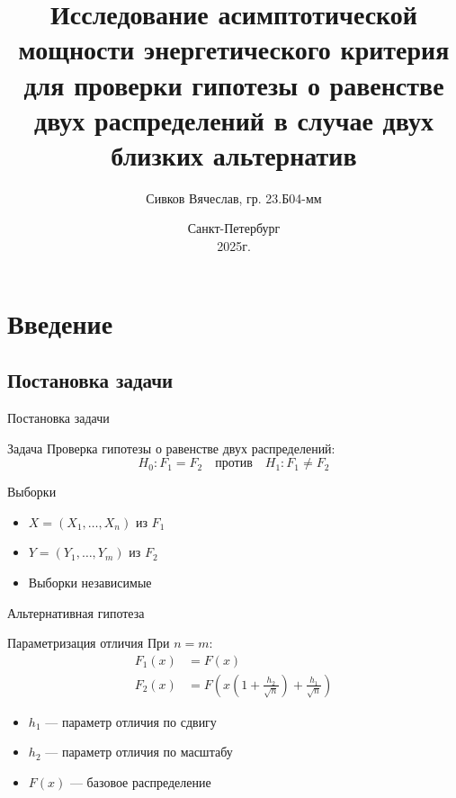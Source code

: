 \documentclass[12pt]{beamer}
\title[Об асимптотической мощности энергетического критерия]{Исследование асимптотической мощности энергетического критерия для проверки гипотезы о равенстве двух распределений в случае двух близких альтернатив}
\author{Сивков Вячеслав, гр. 23.Б04-мм}
\institute{Санкт-Петербургский государственный университет\\
Кафедра статистического моделирования\\[0.03in]
Научный руководитель — д.ф.-м.н. \textbf{В. Б. Мелас}}
\date{  Санкт-Петербург\\ 2025г.}
\begin{document}
\begin{frame}
    \titlepage
\end{frame}


\section{Введение}

\subsection{Постановка задачи}

\begin{frame}{Постановка задачи}
    \begin{block}{Задача}
        Проверка гипотезы о равенстве двух распределений:
        \[
        H_0: F_1 = F_2 \quad \text{против} \quad H_1: F_1 \neq F_2
        \]
    \end{block}
    
    \pause
    
    \begin{block}{Выборки}
        \begin{itemize}
            \item $X = (X_1, \ldots, X_n)$ из $F_1$
            \item $Y = (Y_1, \ldots, Y_m)$ из $F_2$
            \item Выборки независимые
        \end{itemize}
    \end{block}
\end{frame}

\begin{frame}{Альтернативная гипотеза}
    \begin{block}{Параметризация отличия}
        При $n = m$:
        \begin{align*}
        F_1(x) &= F(x) \\
        F_2(x) &= F\left(x \left(1 + \frac{h_2}{\sqrt{n}} \right) + \frac{h_1}{\sqrt{n}}\right)
        \end{align*}
    \end{block}
    
    \begin{itemize}
        \item $h_1$ --- параметр отличия по сдвигу
        \pause
        \item $h_2$ --- параметр отличия по масштабу
        \pause
        \item $F(x)$ --- базовое распределение
    \end{itemize}
\end{frame}
\end{document}
